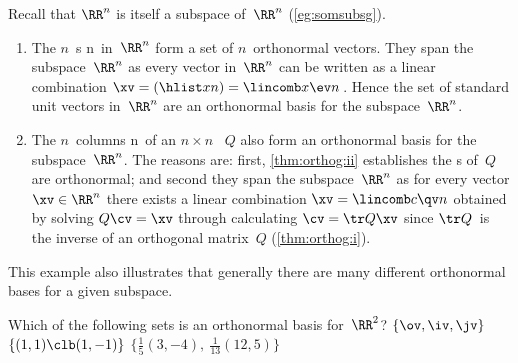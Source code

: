 \begin{example} 
Recall that \(\RR^n\) is itself a subspace of~\(\RR^n\) (\cref{eg:somsubsg}).
\begin{enumerate}
\item The \(n\)~s \hlist\ev n\ in~\(\RR^n\) form a set of \(n\)~orthonormal vectors.
They span the subspace~\(\RR^n\) as every vector in~\(\RR^n\) can be written as a linear combination \(\xv=(\hlist xn)=\lincomb x\ev n\)\,.
Hence the set of standard unit vectors in~\(\RR^n\) are an orthonormal basis for the subspace~\(\RR^n\).

\item The \(n\)~columns \hlist\qv n\ of an \(n\times n\) ~\(Q\) also form an orthonormal basis for the subspace~\(\RR^n\).
The reasons are: first, \cref{thm:orthog:ii} establishes the s of~\(Q\) are orthonormal; and second they span the subspace~\(\RR^n\) as for every vector \(\xv\in\RR^n\) there exists a linear combination \(\xv=\lincomb c\qv n\) obtained by solving \(Q\cv=\xv\) through calculating \(\cv=\tr Q\xv\) since \(\tr Q\)~is the inverse of an orthogonal matrix~\(Q\) (\cref{thm:orthog:i}).
\end{enumerate}
This example also illustrates that generally there are many different orthonormal bases for a given subspace.
\end{example}



\begin{activity}
Which of the following sets is an orthonormal basis for~\(\RR^2\)?
{\(\{\ov,\iv,\jv\}\)}
{\(\{(1,1)\clb (1,-1)\}\)}
{\(\{\frac15(3,-4),\ \frac1{13}(12,5)\}\)}
\end{activity}



